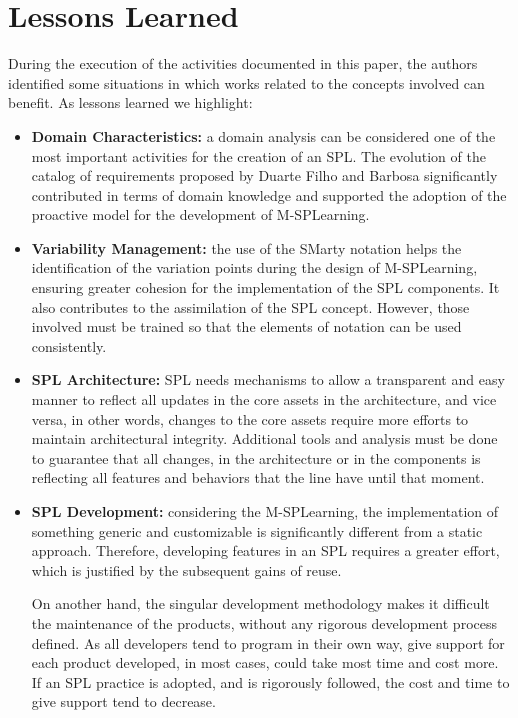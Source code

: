 \section{Lessons Learned}\label{section5}

During the execution of the activities documented in this paper, the authors identified some situations in which works related to the concepts involved can benefit. As lessons learned we highlight:

\begin{itemize}
\item \textbf{Domain Characteristics:} a domain analysis can be considered one of the most important activities for the creation of an SPL. The evolution of the catalog of requirements proposed by Duarte Filho and Barbosa \cite{filho13} significantly contributed in terms of domain knowledge and supported the adoption of the proactive model for the development of M-SPLear\allowbreak ning.
    
\item \textbf{Variability Management:} the use of the SMarty notation helps the identification of the variation points during the design of M-SPLear\allowbreak ning, ensuring greater cohesion for the implementation of the SPL components. It also contributes to the assimilation of the SPL concept. However, those involved must be trained so that the elements of notation can be used consistently.
    
\item \textbf{SPL Architecture:} SPL needs mechanisms to allow a transparent and easy manner to reflect all updates in the core assets in the architecture, and vice versa, in other words, changes to the core assets require more efforts to maintain architectural integrity. Additional tools and analysis must be done to guarantee that all changes, in the architecture or in the components is reflecting all features and behaviors that the line have until that moment.
    
\item \textbf{SPL Development:} considering the M-SPLear\allowbreak ning, the implementation of something generic and customizable is significantly different from a static approach. Therefore, developing features in an SPL requires a greater effort, which is justified by the subsequent gains of reuse.

On another hand, the singular development methodology makes it difficult the maintenance of the products, without any rigorous development process defined. As all developers tend to program in their own way, give support for each product developed, in most cases, could take most time and cost more. If an SPL practice is adopted, and is rigorously followed, the cost and time to give support tend to decrease.
    

\end{itemize}
